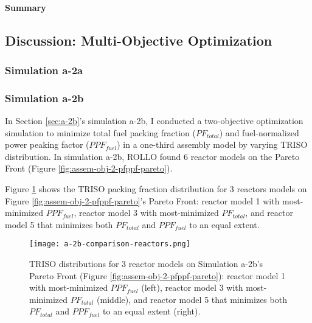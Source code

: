 \paragraph{Summary}

\subsection{Discussion: Multi-Objective Optimization}
\label{sec:assem-discussion-multi}

\subsubsection{Simulation a-2a}

\subsubsection{Simulation a-2b}
In Section \ref{sec:a-2b}'s simulation a-2b, I conducted a two-objective 
optimization simulation to minimize total fuel packing fraction ($PF_{total}$) and 
fuel-normalized power peaking factor ($PPF_{fuel}$) in a one-third assembly model 
by varying TRISO distribution. 
In simulation a-2b, ROLLO found 6 reactor models on the Pareto Front (Figure 
\ref{fig:assem-obj-2-pfppf-pareto}). 

Figure \ref{fig:a-2b-comparison-reactors} shows the TRISO packing fraction distribution 
for 3 reactors models on Figure \ref{fig:assem-obj-2-pfppf-pareto}'s Pareto Front: 
reactor model 1 with most-minimized $PPF_{fuel}$, reactor model 3 with most-minimized 
$PF_{total}$, and reactor model 5 that minimizes both $PF_{total}$ and $PPF_{fuel}$ to an 
equal extent.
\begin{figure}[htbp!]
    \centering
    \texttt{[image: a-2b-comparison-reactors.png]}  
    \caption{TRISO distributions for 3 reactor models on Simulation a-2b's Pareto Front (Figure 
    \ref{fig:assem-obj-2-pfppf-pareto}): reactor model 1 with most-minimized $PPF_{fuel}$ (left), 
    reactor model 3 with most-minimized $PF_{total}$ (middle), and reactor model 5 that 
    minimizes both $PF_{total}$ and $PPF_{fuel}$ to an equal extent (right).}
    \label{fig:a-2b-comparison-reactors}
\end{figure}

